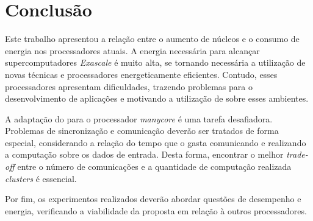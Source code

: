 \chapter{Conclusão}
\label{cha:conclusao}
Este trabalho apresentou a relação entre o aumento de núcleos e o consumo de
energia nos processadores atuais. A energia necessária para alcançar supercomputadores
\textit{Exascale} é muito alta, se tornando necessária a utilização de
novas técnicas e processadores energeticamente eficientes. Contudo, esses
processadores apresentam dificuldades, trazendo problemas para o desenvolvimento
de aplicações e motivando a utilização de \fws sobre esses ambientes.

A adaptação do \fw para o processador \textit{manycore} \mppa é uma
tarefa desafiadora. Problemas de sincronização e comunicação deverão ser
tratados de forma especial, considerando a relação do tempo que o \fw gasta
comunicando e realizando a computação sobre os dados de entrada. Desta forma,
encontrar o melhor \textit{trade-off} entre o número de comunicações e a
quantidade de computação realizada \textit{clusters} é essencial.

Por fim, os experimentos realizados deverão abordar questões de desempenho e
energia, verificando a viabilidade da proposta em relação à outros
processadores.
